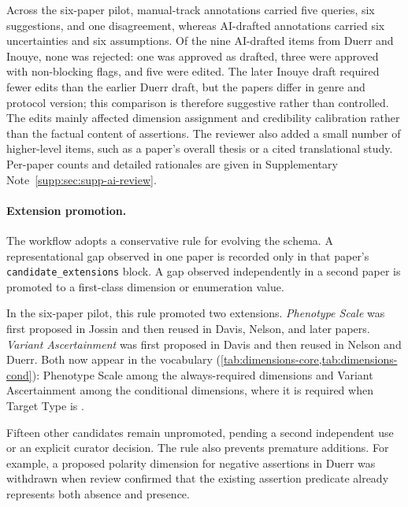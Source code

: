Across the six-paper pilot, manual-track annotations carried five queries,
six suggestions, and one disagreement, whereas AI-drafted annotations
carried six uncertainties and six assumptions. Of the nine AI-drafted items
from Duerr and Inouye, none was rejected: one was approved as drafted,
three were approved with non-blocking flags, and five were edited. The
later Inouye draft required fewer edits than the earlier Duerr draft, but
the papers differ in genre and protocol version; this comparison is
therefore suggestive rather than controlled. The edits mainly affected
dimension assignment and credibility calibration rather than the factual
content of assertions. The reviewer also added a small number of
higher-level items, such as a paper's overall thesis or a cited
translational study. Per-paper counts and detailed rationales are given in
Supplementary Note~\ref*{supp:sec:supp-ai-review}.

\paragraph{Extension promotion.}
The workflow adopts a conservative rule for evolving the schema. A
representational gap observed in one paper is recorded only in that
paper's \texttt{candidate\_extensions} block. A gap observed
independently in a second paper is promoted to a first-class dimension or
enumeration value.

In the six-paper pilot, this rule promoted two extensions. \emph{Phenotype
Scale} was first proposed in Jossin and then reused in Davis, Nelson, and
later papers. \emph{Variant Ascertainment} was first proposed in Davis and
then reused in Nelson and Duerr. Both now appear in the vocabulary
(\cref{tab:dimensions-core,tab:dimensions-cond}): Phenotype Scale among
the always-required dimensions and Variant Ascertainment among the
conditional dimensions, where it is required when Target Type is
.

Fifteen other candidates remain unpromoted, pending a second independent
use or an explicit curator decision. The rule also prevents premature
additions. For example, a proposed polarity dimension for negative
assertions in Duerr was withdrawn when review confirmed that the existing
assertion predicate already represents both absence and presence.
